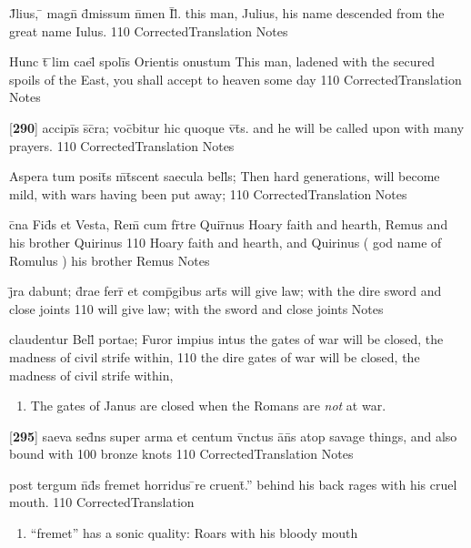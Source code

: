 \latline
  {J\={}lius, \={} magn\={} d\={}missum n\={}men I\={}l\={}.}
  { this man, Julius, his name descended from the great name Iulus. }
  {110}
  { CorrectedTranslation }
  { Notes }


\latline
  {Hunc t\={} \={}lim cael\={} spoli\={\macron {\i}}s Orientis onustum}
  { This man, ladened with the secured spoils of the East, you shall accept to heaven some day }
  {110}
  { CorrectedTranslation }
  { Notes }


\latline
  {[\textbf{290}] accipi\={}s s\={}c\={}ra; voc\={}bitur hic quoque v\={}t\={\macron {\i}}s.}
  { and he will be called upon with many prayers. }
  {110}
  { CorrectedTranslation }
  { Notes }


\latline
  {Aspera tum posit\={\macron {\i}}s m\={\macron {\i}}t\={}scent saecula bell\={\macron {\i}}s;}
  { Then hard generations, will become mild, with wars having been put away; }
  {110}
  { CorrectedTranslation }
  { Notes }


\latline
  {c\={}na Fid\={}s et Vesta, Rem\={} cum fr\={}tre Quir\={\macron {\i}}nus}
  { Hoary faith and hearth, Remus and his brother Quirinus }
  {110}
  { Hoary faith and hearth,  and Quirinus ( god name of Romulus ) his brother Remus }
  { Notes }


\latline
  {j\={}ra dabunt; d\={\macron {\i}}rae ferr\={} et comp\={}gibus art\={\macron {\i}}s}
  { will give law; with the dire sword and close joints }
  {110}
  { will give law; with the sword and close joints }
  { Notes }


\latline
  {claudentur Bell\={\macron {\i}} portae; Furor impius intus}
  { the gates of war will be closed, the madness of civil strife within, }
  {110}
  { the dire gates of war will be closed, the madness of civil strife within, }
  { \begin{enumerate}
  	\item The gates of Janus are closed when the Romans are \emph{not} at war.
  \end{enumerate} }


\latline
  {[\textbf{295}] saeva sed\={}ns super arma et centum v\={\macron {\i}}nctus a\={}n\={\macron {\i}}s}
  { atop savage things, and also bound with 100 bronze knots }
  {110}
  { CorrectedTranslation }
  { Notes }


\latline
  {post tergum n\={}d\={\macron {\i}}s fremet horridus \={}re cruent\={}.''}
  { behind his back rages with his cruel mouth. }
  {110}
  { CorrectedTranslation }
  { \begin{enumerate}
  	\item ``fremet'' has a sonic quality:  Roars with his bloody mouth
  \end{enumerate} }
